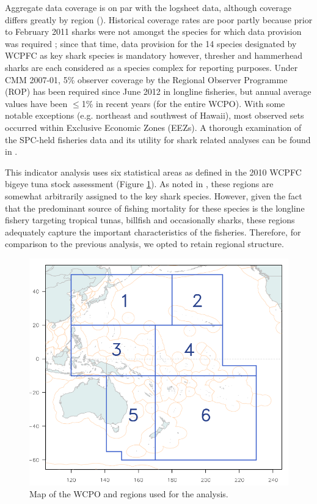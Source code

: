 \documentclass[12pt]{SCreport}
\begin{document}
Aggregate data coverage is on par with the logsheet data, although coverage differs greatly by region (). Historical coverage rates are poor partly because prior to February 2011 sharks were not amongst the species for which data provision was required \citep{WCPFC2013_a}; since that time, data provision for the 14 species designated by WCPFC as key shark species is mandatory however, thresher and hammerhead sharks are each considered as a species complex for reporting purposes. Under CMM 2007-01, 5\% observer coverage by the Regional Observer Programme (ROP) has been required since June 2012 in longline fisheries, but annual average values have been $\leq$1\% in recent years (for the entire WCPO). With some notable exceptions (e.g. northeast and southwest of Hawaii), most observed sets occurred within Exclusive Economic Zones (EEZs). A thorough examination of the SPC-held fisheries data and its utility for shark related analyses can be found in \citet{Clarke2011_a}.

This indicator analysis uses six statistical areas as defined in the 2010 WCPFC bigeye tuna stock assessment (Figure \ref{fig:fig01}). As noted in \citet{Clarke2011_a}, these regions are somewhat arbitrarily assigned to the key shark species. However, given the fact that the predominant source of fishing mortality for these species is the longline fishery targeting tropical tunas, billfish and occasionally sharks, these regions adequately capture the important characteristics of the fisheries. Therefore, for comparison to the previous analysis, we opted to retain regional structure.


\begin{figure}
\begin{center}
\includegraphics[width=\textwidth]{../GRAPHICS/Defined/FIG_01_MAP}
\caption{\label{fig:fig01} Map of the WCPO and regions used for the analysis.}
\end{center}
\end{figure}
\end{document}
